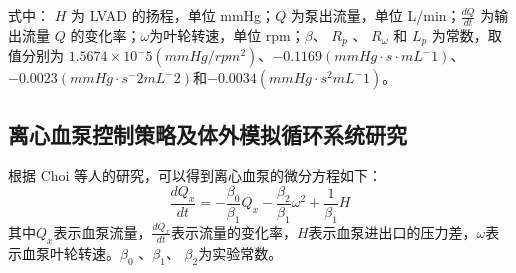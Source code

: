 \documentclass[titlepage,12pt]{article}
\begin{document}
式中： $H$ 为 LVAD 的扬程，单位 mmHg；$Q$ 为泵出流量，单位 L/min；$\frac{dQ}{dt}$ 为输出流量 $Q$ 的变化率；$\omega$为叶轮转速，单位 rpm；$β$、 $R_p$ 、 $R_{\omega}$ 和 $L_p$ 为常数，取值分别为 $1.5674×10^-5(mmHg/rpm^2)$、$-0.1169(mmHg·s·mL^-1)$、$-0.0023(mmHg·s^-2 mL^-2)$和$-0.0034(mmHg·s^2 mL^-1)$。


\subsection{离心血泵控制策略及体外模拟循环系统研究}
根据 Choi 等人的研究，可以得到离心血泵的微分方程如下：
\begin{equation*}
    \frac{dQ_x}{dt} = -\frac{\beta_0}{\beta_1} Q_x - \frac{\beta_2}{\beta_1} \omega^2 + \frac{1}{\beta_1} H
\end{equation*}
其中$Q_x$表示血泵流量，$\frac{dQ_x}{dt}$表示流量的变化率，$H$表示血泵进出口的压力差，$\omega$表示血泵叶轮转速。$\beta_0$ 、$\beta_1$、 $\beta_2$为实验常数。
\end{document}
